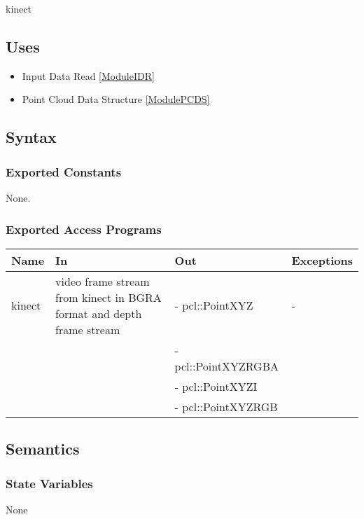 \documentclass[12pt, titlepage]{article}
\begin{document}
kinect

\subsection{Uses}

\begin{itemize}
\item Input Data Read \ref{ModuleIDR}
\item Point Cloud Data Structure \ref{ModulePCDS}
\end{itemize}

\subsection{Syntax}

\subsubsection{Exported Constants}

None.

\subsubsection{Exported Access Programs}

\begin{center}
\begin{tabular}{p{2cm} p{4cm} p{5cm} p{2cm}}
\hline
\textbf{Name} & \textbf{In} & \textbf{Out} & \textbf{Exceptions} \\
\hline
kinect & video frame stream from kinect in BGRA format and depth frame stream
& - pcl::PointXYZ & - \\
 & & - pcl::PointXYZRGBA &  \\
 & & - pcl::PointXYZI &  \\
 & & - pcl::PointXYZRGB &  \\
\hline
\end{tabular}
\end{center}

\subsection{Semantics}

\subsubsection{State Variables}

None
\end{document}
